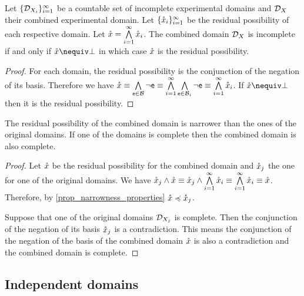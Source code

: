 \documentclass[11pt,letterpaper,fleqn]{memoir} %
\begin{document}
\begin{mathSection}
	\begin{prop}
		Let $\{\edomain_{X_i}\}_{i=1}^{\infty}$ be a countable set of incomplete experimental domains and $\edomain_X$ their combined experimental domain. Let $\{\resPoss_i\}_{i=1}^{\infty}$ be  the residual possibility of each respective domain. Let $\resPoss = \bigAND\limits_{i=1}^{\infty} \resPoss_i$. The combined domain $\edomain_X$ is incomplete if and only if $\resPoss \nequiv \contradiction$ in which case $\resPoss$ is the residual possibility.
	\end{prop}
	
	\begin{proof}
		For each domain, the residual possibility is the conjunction of the negation of its basis. Therefore we have $\resPoss \equiv \bigAND\limits_{\stmt[e] \in \basis} \NOT \stmt[e] \equiv \bigAND\limits_{i=1}^{\infty} \bigAND\limits_{\stmt[e] \in \basis_i} \NOT \stmt[e] \equiv \bigAND\limits_{i=1}^{\infty} \resPoss_i$. If $\resPoss \nequiv \contradiction$ then it is the residual possibility.
	\end{proof}
	
	\begin{coro}
		The residual possibility of the combined domain is narrower than the ones of the original domains. If one of the domains is complete then the combined domain is also complete.
	\end{coro}

	\begin{proof}
		Let $\resPoss$ be the residual possibility for the combined domain and $\resPoss_j$ the one for one of the original domains. We have $\resPoss_j \AND \resPoss \equiv \resPoss_j \AND \bigAND\limits_{i=1}^{\infty} \resPoss_i \equiv \bigAND\limits_{i=1}^{\infty} \resPoss_i \equiv \resPoss$. Therefore, by \ref{prop_narrowness_properties} $\resPoss \narrower \resPoss_j$.
		
		Suppose that one of the original domains $\edomain_{X_j}$ is complete. Then the conjunction of the negation of its basis $\resPoss_j$ is a contradiction. This means the conjunction of the negation of the basis of the combined domain $\resPoss$ is also a contradiction and the combined domain is complete.
	\end{proof}
\end{mathSection}

\subsection{Independent domains}
\end{document}
